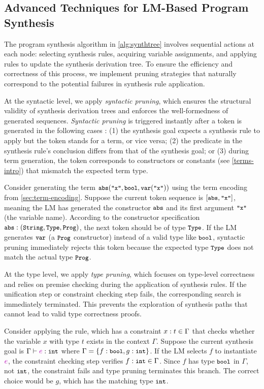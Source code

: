 \documentclass[manuscript,screen]{acmart}
\newcommand{\stlctype}[3]{{#1} \vdash {#2} : {#3}}
\newcommand{\sk}[1]{\textcolor{skunknown}{#1}}
\newcommand{\tcode}[1]{{\small \texttt{\spaceskip=0.2em #1}}}
\begin{document}
\subsection{Advanced Techniques for LM-Based Program Synthesis}
The program synthesis algorithm in \autoref{alg:synthtree} involves sequential actions at each node: selecting synthesis rules, acquiring variable assignments, and applying rules to update the synthesis derivation tree. 
%
To ensure the efficiency and correctness of this process, we implement pruning strategies that naturally correspond to the potential failures in synthesis rule application. 

At the syntactic level, we apply \emph{syntactic pruning}, which ensures the structural validity of synthesis derivation trees and enforces the well-formedness of generated sequences.
\emph{Syntactic pruning} is triggered instantly    {\color{revblue}after } a token is generated  {\color{revblue}in the following cases} : (1) the synthesis goal expects a synthesis rule to apply but the token stands for a term, or vice versa; (2) the predicate in the synthesis rule's conclusion differs from that of the synthesis goal; or (3) during term generation, the token corresponds to constructors or constants (see \autoref{terms-intro}) that mismatch the expected term type.
%
\begin{example}
Consider generating the term $\tcode{abs}(\tcode{"x"}, \tcode{bool}, \tcode{var}(\tcode{"x"}))$ using the term encoding from \autoref{sec:term-encoding}. Suppose the current token sequence is $[\tcode{abs}, \tcode{"x"}]$, meaning the LM has generated the constructor $\tcode{abs}$ and its first argument $\tcode{"x"}$ (the variable name). According to the constructor specification $\tcode{abs} : (\tcode{String}, \tcode{Type}, \tcode{Prog})$, the next token should be of type $\tcode{Type}$. If the LM generates $\tcode{var}$ (a $\tcode{Prog}$ constructor) instead of a valid type like $\tcode{bool}$, syntactic pruning immediately rejects this token because the expected type $\tcode{Type}$ does not match the actual type $\tcode{Prog}$.
\end{example}

At the type level, we apply \emph{type pruning}, which focuses on type-level correctness and relies on premise checking during the application of synthesis rules. 
If the unification step or constraint checking step fails, the corresponding search is immediately terminated. 
This prevents the exploration of synthesis paths that cannot lead to valid type correctness proofs.
%
\begin{example}
Consider applying the  rule, which has a constraint ${x}:{t} \in {\Gamma}$ that checks whether the variable $x$ with type $t$ exists in the context $\Gamma$. Suppose the current synthesis goal is $\stlctype{\Gamma}{\sk{e}}{\tcode{int}}$ where $\Gamma = \{f : \tcode{bool}, g : \tcode{int}\}$. If the LM selects $f$ to instantiate $\sk{e}$, the constraint checking step verifies $\checkBinding{\Gamma}{f}{\tcode{int}}$. Since $f$ has type $\tcode{bool}$ in $\Gamma$, not $\tcode{int}$, the constraint fails and type pruning terminates this branch. The correct choice would be $g$, which has the matching type $\tcode{int}$.
\end{example}
\end{document}
